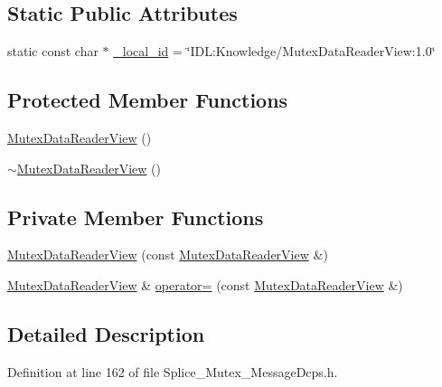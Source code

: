 \subsection*{Static Public Attributes}
\begin{DoxyCompactItemize}
\item 
static const char $\ast$ \hyperlink{classKnowledge_1_1MutexDataReaderView_a807ab0ccc917184fa6f2ab18558fc0d5}{\_\-local\_\-id} = \char`\"{}IDL:Knowledge/MutexDataReaderView:1.0\char`\"{}
\end{DoxyCompactItemize}
\subsection*{Protected Member Functions}
\begin{DoxyCompactItemize}
\item 
\hyperlink{classKnowledge_1_1MutexDataReaderView_a4daecffd85b64c19460b4b49246415a4}{MutexDataReaderView} ()
\item 
\hyperlink{classKnowledge_1_1MutexDataReaderView_ab0cc7ad2b71dd44234b8669d3c2c54a1}{$\sim$MutexDataReaderView} ()
\end{DoxyCompactItemize}
\subsection*{Private Member Functions}
\begin{DoxyCompactItemize}
\item 
\hyperlink{classKnowledge_1_1MutexDataReaderView_a74d02ec8dbcd965737bc54d48d246ec7}{MutexDataReaderView} (const \hyperlink{classKnowledge_1_1MutexDataReaderView}{MutexDataReaderView} \&)
\item 
\hyperlink{classKnowledge_1_1MutexDataReaderView}{MutexDataReaderView} \& \hyperlink{classKnowledge_1_1MutexDataReaderView_a936f62beb9ec33e476dd5b212e0178d7}{operator=} (const \hyperlink{classKnowledge_1_1MutexDataReaderView}{MutexDataReaderView} \&)
\end{DoxyCompactItemize}


\subsection{Detailed Description}


Definition at line 162 of file Splice\_\-Mutex\_\-MessageDcps.h.



